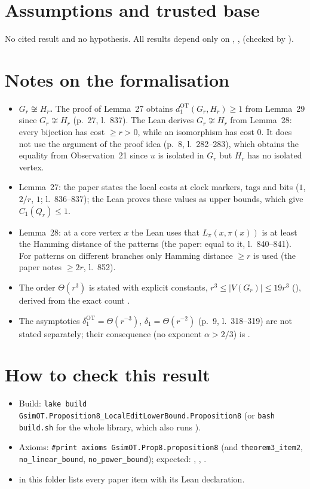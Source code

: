 \section{Assumptions and trusted base}
No cited result and no hypothesis. All results depend only on , ,
 (checked by ).

\section{Notes on the formalisation}
\begin{itemize}
\item \textbf{$G_r\not\cong H_r$.} The proof of Lemma~27 obtains $d_1^{\mathrm{OT}}(G_r,H_r)\ge1$ from Lemma~29
  since $G_r\not\cong H_r$ (p.~27, l.~837). The Lean derives $G_r\not\cong H_r$ from Lemma~28: every bijection
  has cost $\ge r>0$, while an isomorphism has cost $0$. It does not use the argument of the proof idea
  (p.~8, l.~282--283), which obtains the equality from Observation~21 since $u$ is isolated in $G_r$ but
  $H_r$ has no isolated vertex.
\item Lemma~27: the paper states the local costs at clock markers, tags and bits ($1$, $2/r$, $1$; l.~836--837);
  the Lean proves these values as upper bounds, which give $C_1(Q_r)\le1$.
\item Lemma~28: at a core vertex $x$ the Lean uses that $L_\pi(x,\pi(x))$ is at least the Hamming distance of
  the patterns (the paper: equal to it, l.~840--841). For patterns on different branches only Hamming
  distance $\ge r$ is used (the paper notes $\ge 2r$, l.~852).
\item The order $\Theta(r^3)$ is stated with explicit constants, $r^3\le|V(G_r)|\le19r^3$
  (), derived from the exact count .
\item The asymptotics $\delta_1^{\mathrm{OT}}=\Theta(r^{-3})$, $\delta_1=\Theta(r^{-2})$ (p.~9, l.~318--319) are
  not stated separately; their consequence (no exponent $\alpha>2/3$) is .
\end{itemize}

\section{How to check this result}
\begin{itemize}
\item Build: \texttt{lake build GsimOT.Proposition8\_LocalEditLowerBound.Proposition8} (or \texttt{bash build.sh}
  for the whole library, which also runs ).
\item Axioms: \texttt{\#print axioms GsimOT.Prop8.proposition8} (and \texttt{theorem3\_item2},
  \texttt{no\_linear\_bound}, \texttt{no\_power\_bound}); expected: , ,
  .
\item {} in this folder lists every paper item with its Lean declaration.
\end{itemize}

